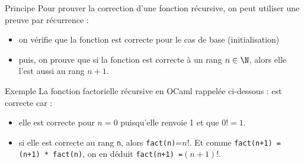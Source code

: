 \documentclass[10pt]{beamer}
\begin{document}
\begin{frame}[fragile]{\Ctitle}{\stitle}
	\begin{block}{Principe}
		Pour prouver la correction d'une fonction récursive, on peut utiliser une preuve par récurrence :
		\begin{itemize}
		\item<2-> on vérifie que la fonction est correcte pour le cas de base (initialisation)
		\item<3-> puis, on prouve que si la fonction est correcte à un rang $n \in \N$, alors elle l'est aussi au rang $n+1$.
		\end{itemize}
	\end{block}
	{
		\begin{exampleblock}{Exemple}
			La fonction factorielle récursive en OCaml rappelée ci-dessous :
			est correcte car :
			\begin{itemize}
			\item<5-> elle est correcte pour $n=0$ puisqu'elle renvoie 1 et que $0!=1$.
			\item<6-> si elle est correcte au rang {\tt n}, alors {\tt fact(n)}=$n!$. Et comme {\tt fact(n+1) = (n+1) * fact(n)}, on en déduit {\tt fact(n+1) =}$(n+1)!$.
		\end{itemize}
		\end{exampleblock}
	}
\end{frame}
\end{document}
